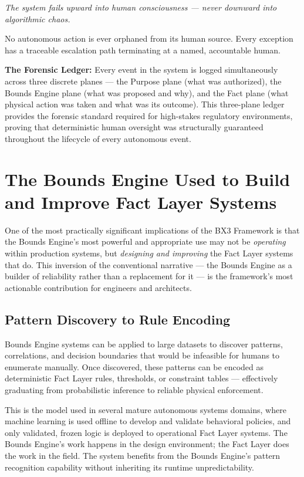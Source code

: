 \documentclass[12pt]{article}
\begin{document}
\textit{The system fails upward into human consciousness --- never downward into algorithmic chaos.}

No autonomous action is ever orphaned from its human source. Every exception has a traceable escalation path terminating at a named, accountable human.

\textbf{The Forensic Ledger:} Every event in the system is logged simultaneously across three discrete planes --- the Purpose plane (what was authorized), the Bounds Engine plane (what was proposed and why), and the Fact plane (what physical action was taken and what was its outcome). This three-plane ledger provides the forensic standard required for high-stakes regulatory environments, proving that deterministic human oversight was structurally guaranteed throughout the lifecycle of every autonomous event.

\section{The Bounds Engine Used to Build and Improve Fact Layer Systems}
\label{sec:building}

One of the most practically significant implications of the BX3 Framework is that the Bounds Engine's most powerful and appropriate use may not be \textit{operating} within production systems, but \textit{designing and improving} the Fact Layer systems that do. This inversion of the conventional narrative --- the Bounds Engine as a builder of reliability rather than a replacement for it --- is the framework's most actionable contribution for engineers and architects.

\subsection{Pattern Discovery to Rule Encoding}

Bounds Engine systems can be applied to large datasets to discover patterns, correlations, and decision boundaries that would be infeasible for humans to enumerate manually. Once discovered, these patterns can be encoded as deterministic Fact Layer rules, thresholds, or constraint tables --- effectively graduating from probabilistic inference to reliable physical enforcement.

This is the model used in several mature autonomous systems domains, where machine learning is used offline to develop and validate behavioral policies, and only validated, frozen logic is deployed to operational Fact Layer systems. The Bounds Engine's work happens in the design environment; the Fact Layer does the work in the field. The system benefits from the Bounds Engine's pattern recognition capability without inheriting its runtime unpredictability.
\end{document}
